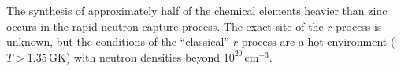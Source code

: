 {The synthesis of approximately half of the chemical elements heavier than zinc %
 occurs in the rapid neutron-capture process.
The exact site of the $r$-process is unknown, but the conditions of 
the ``classical'' $r$-process %
are a hot environment ($T> 1.35$\,GK) with neutron densities beyond %
$10^{20}$\,cm$^{-3}$. %
}
